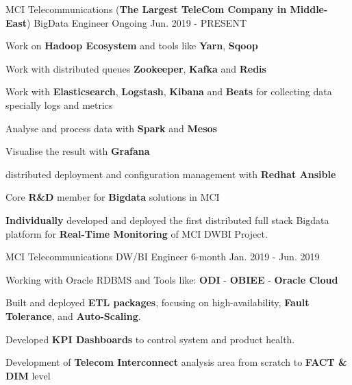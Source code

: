

\begin{cventries}

  \cventry
    {MCI Telecommunications (\textbf{The Largest TeleCom Company in Middle-East})} %
    {BigData Engineer} %
    {Ongoing} %
    {Jun. 2019 - PRESENT} %
    {
      \begin{cvitems} %
        \item {Work on \textbf{Hadoop Ecosystem} and tools like \textbf{Yarn}, \textbf{Sqoop}}
        \item {Work with distributed queues \textbf{Zookeeper}, \textbf{Kafka} and \textbf{Redis}}
        \item {Work with \textbf{Elasticsearch}, \textbf{Logstash}, \textbf{Kibana} and \textbf{Beats} for collecting data specially logs and metrics}
        \item {Analyse and process data with \textbf{Spark} and \textbf{Mesos}}
        \item {Visualise the result with \textbf{Grafana}}
        \item {distributed deployment and configuration management with \textbf{Redhat Ansible}}
        \item {Core \textbf{R\&D} member for \textbf{Bigdata} solutions in MCI}
        \item {\textbf{Individually} developed and deployed the first distributed full stack Bigdata platform for \textbf{Real-Time Monitoring} of MCI DWBI Project.}
      \end{cvitems}
    }
    
  \cventry
    {MCI Telecommunications} %
    {DW/BI Engineer} %
    {6-month} %
    {Jan. 2019 - Jun. 2019} %
    {
      \begin{cvitems} %
        \item {Working with Oracle RDBMS and Tools like: \textbf{ODI} - \textbf{OBIEE} - \textbf{Oracle Cloud}}
        \item {Built and deployed \textbf{ETL packages}, focusing on high-availability, \textbf{Fault Tolerance}, and \textbf{Auto-Scaling}.}
        \item {Developed \textbf{KPI Dashboards} to control system and product health.}
        \item {Development of \textbf{Telecom Interconnect} analysis area from scratch to \textbf{FACT \& DIM} level}
      \end{cvitems}
    }
    


\end{cventries}
